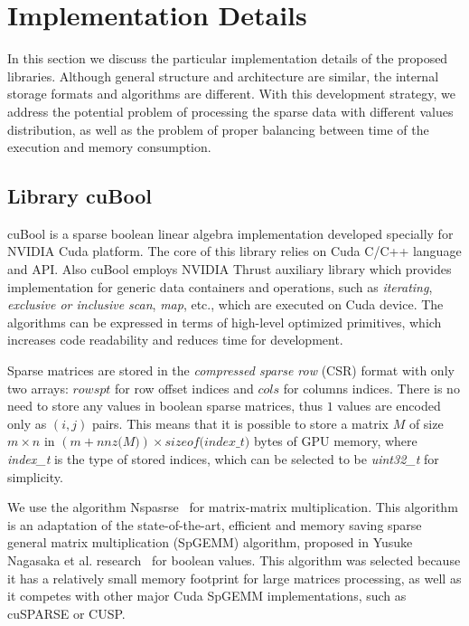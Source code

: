 \section{Implementation Details}

In this section we discuss the particular implementation details of the proposed libraries.
Although general structure and architecture are similar, the internal storage formats and algorithms are different.
With this development strategy, we address the potential problem of processing the sparse data with different values distribution, as well as the problem of proper balancing between time of the execution and memory consumption.

\subsection{Library cuBool}

cuBool is a sparse boolean linear algebra implementation developed specially for NVIDIA Cuda platform.
The core of this library relies on Cuda C/C++ language and API.
Also cuBool employs NVIDIA Thrust auxiliary library which provides implementation for generic data containers and operations, such as \textit{iterating}, \textit{exclusive or inclusive scan}, \textit{map}, etc., which are executed on Cuda device.
The algorithms can be expressed in terms of high-level optimized primitives, which increases code readability and reduces time for development.

Sparse matrices are stored in the \textit{compressed sparse row} (CSR) format with only two arrays: $rowspt$ for row offset indices and $cols$ for columns indices.
There is no need to store any values in boolean sparse matrices, thus $1$ values are encoded only as $(i, j)$ pairs.
This means that it is possible to store a matrix $M$ of size $m \times n$ in $(m + \textit{nnz(M)}) \times \textit{sizeof(index\_t)}$ bytes of GPU memory, where \textit{index\_t} is the type of stored indices, which can be selected to be \textit{uint32\_t} for simplicity.

We use the algorithm Nspasrse~\cite{inproceedings:cfpq_for_redis_graph} for matrix-matrix multiplication.
This algorithm is an adaptation of the state-of-the-art, efficient and memory saving sparse general matrix multiplication (SpGEMM) algorithm, proposed in Yusuke Nagasaka et al. research~\cite{algo:spgemm:8025284} for boolean values.
This algorithm was selected because it has a relatively small memory footprint for large matrices processing, as well as it competes with other major Cuda SpGEMM implementations, such as cuSPARSE or CUSP.

